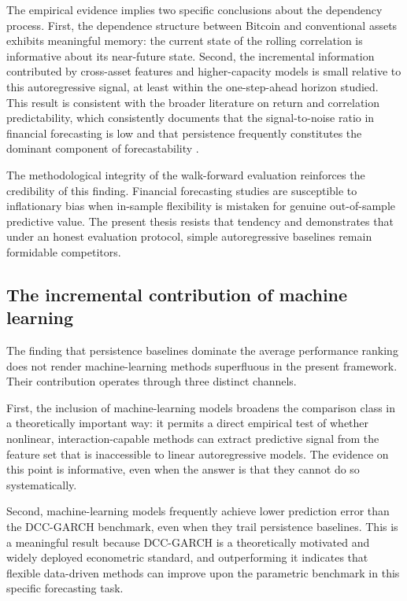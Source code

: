 The empirical evidence implies two specific conclusions about the dependency process. First, the dependence structure between Bitcoin and conventional assets exhibits meaningful memory: the current state of the rolling correlation is informative about its near-future state. Second, the incremental information contributed by cross-asset features and higher-capacity models is small relative to this autoregressive signal, at least within the one-step-ahead horizon studied. This result is consistent with the broader literature on return and correlation predictability, which consistently documents that the signal-to-noise ratio in financial forecasting is low and that persistence frequently constitutes the dominant component of forecastability \cite{welch2008}.

The methodological integrity of the walk-forward evaluation reinforces the credibility of this finding. Financial forecasting studies are susceptible to inflationary bias when in-sample flexibility is mistaken for genuine out-of-sample predictive value. The present thesis resists that tendency and demonstrates that under an honest evaluation protocol, simple autoregressive baselines remain formidable competitors.

\subsection{The incremental contribution of machine learning}

The finding that persistence baselines dominate the average performance ranking does not render machine-learning methods superfluous in the present framework. Their contribution operates through three distinct channels.

First, the inclusion of machine-learning models broadens the comparison class in a theoretically important way: it permits a direct empirical test of whether nonlinear, interaction-capable methods can extract predictive signal from the feature set that is inaccessible to linear autoregressive models. The evidence on this point is informative, even when the answer is that they cannot do so systematically.

Second, machine-learning models frequently achieve lower prediction error than the DCC-GARCH benchmark, even when they trail persistence baselines. This is a meaningful result because DCC-GARCH is a theoretically motivated and widely deployed econometric standard, and outperforming it indicates that flexible data-driven methods can improve upon the parametric benchmark in this specific forecasting task.

